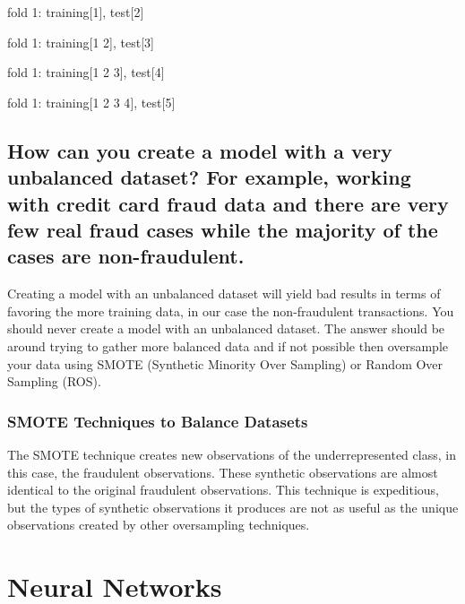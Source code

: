 \documentclass[
]{book}
\begin{document}
fold 1: training{[}1{]}, test{[}2{]}

fold 1: training{[}1 2{]}, test{[}3{]}

fold 1: training{[}1 2 3{]}, test{[}4{]}

fold 1: training{[}1 2 3 4{]}, test{[}5{]}

\hypertarget{how-can-you-create-a-model-with-a-very-unbalanced-dataset-for-example-working-with-credit-card-fraud-data-and-there-are-very-few-real-fraud-cases-while-the-majority-of-the-cases-are-non-fraudulent.}{%
\section{How can you create a model with a very unbalanced dataset? For example, working with credit card fraud data and there are very few real fraud cases while the majority of the cases are non-fraudulent.}\label{how-can-you-create-a-model-with-a-very-unbalanced-dataset-for-example-working-with-credit-card-fraud-data-and-there-are-very-few-real-fraud-cases-while-the-majority-of-the-cases-are-non-fraudulent.}}

Creating a model with an unbalanced dataset will yield bad results in terms of favoring the more training data, in our case the non-fraudulent transactions. You should never create a model with an unbalanced dataset. The answer should be around trying to gather more balanced data and if not possible then oversample your data using SMOTE (Synthetic Minority Over Sampling) or Random Over Sampling (ROS).

\hypertarget{smote-techniques-to-balance-datasets}{%
\subsection{SMOTE Techniques to Balance Datasets}\label{smote-techniques-to-balance-datasets}}

The SMOTE technique creates new observations of the underrepresented class, in this case, the fraudulent observations. These synthetic observations are almost identical to the original fraudulent observations. This technique is expeditious, but the types of synthetic observations it produces are not as useful as the unique observations created by other oversampling techniques.

\hypertarget{neural-networks}{%
\chapter{Neural Networks}\label{neural-networks}}
\end{document}
